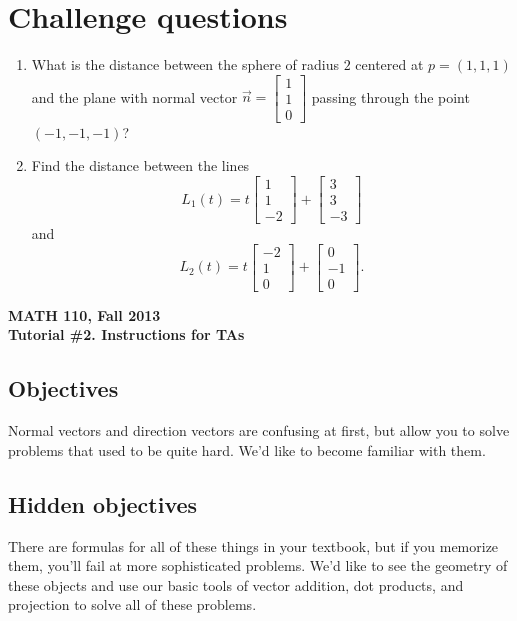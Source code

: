 \documentclass[11pt]{exam}
\newcommand{\mat}[1]{\begin{bmatrix}#1\end{bmatrix}}
\newcommand{\mthCourse}{MATH 110}
\newcommand{\mthTerm}{Fall 2013}
\newcommand{\mthTutorialNumber}{2}
\begin{document}
\section*{Challenge questions}

\begin{enumerate}[resume]

	\item What is the distance between the sphere of radius $2$ centered 
	at $p=(1,1,1)$ and the plane with normal vector $\vec n=\mat{1\\1\\0}$
	passing through the point $(-1,-1,-1)$?


	\item  Find the distance between the lines 
	\[
		L_1(t)=t\mat{1\\1\\-2}+\mat{3\\3\\-3}
	\] and \[
		L_2(t)=t\mat{-2\\1\\0}+\mat{0\\-1\\0}.
	\]
\end{enumerate}



\newpage
{\small
	\begin{center}
		{\bf \mthCourse, \mthTerm}\\ 
		{\bf Tutorial \#\mthTutorialNumber. Instructions for TAs}
	\end{center}
}

\subsection*{Objectives}

	Normal vectors and direction vectors are confusing at first, but allow
	you to solve problems that used to be quite hard.  We'd like
	to become familiar with them.

\subsection*{Hidden objectives}
	
	There are formulas for all of these things in your textbook, but if you memorize
	them, you'll fail at more sophisticated problems.  We'd like to see the geometry
	of these objects and use our basic tools of vector addition, dot products, and
	projection to solve all of these problems.
\end{document}
